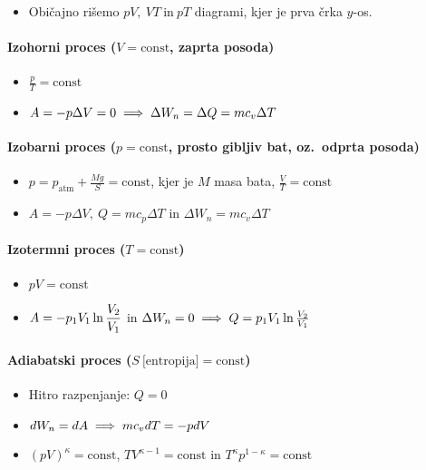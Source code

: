 \begin{itemize}
    \item Običajno rišemo \(pV, \ VT \ \text{in} \ pT\) diagrami, kjer je prva črka \(y\)-os.
\end{itemize}

\paragraph{Izohorni proces (\(V = \text{const}\), zaprta posoda)}
\begin{itemize}
    \item \(\frac{p}{T} = \text{const}\)
    \item \(A = -p \Delta V = 0 \implies \Delta W_n =  \Delta Q = mc_v  \Delta T\)
\end{itemize}

\paragraph{Izobarni proces (\(p = \text{const}\), prosto gibljiv bat, oz.\ odprta posoda)}
\begin{itemize}
    \item \(p = p_\text{atm} + \frac{Mg}{S} = \text{const}\), kjer je \(M\) masa bata, \(\frac{V}{T} = \text{const}\)
    \item \(A = -p\Delta V, \ Q = mc_p \Delta T\) in \(\Delta W_n = mc_v \Delta T\)
\end{itemize}

\paragraph{Izotermni proces (\(T = \text{const}\))}
\begin{itemize}
    \item \(pV = \text{const}\)
    \item \(\displaystyle A = -p_1V_1 \ln \frac{V_2}{V_1}\) in \(\Delta W_n = 0 \implies Q = p_1V_1 \ln \frac{V_2}{V_1}\)
\end{itemize}

\paragraph{Adiabatski proces (\(S \  \text{[entropija]} = \text{const}\))}
\begin{itemize}
    \item Hitro razpenjanje: \(Q = 0\)
    \item \(dW_n = dA \implies mc_vdT = -pdV\)
    \item \((pV)^\kappa = \text{const}\), \(TV^{\kappa-1} = \text{const}\) in \(T^\kappa p^{1 - \kappa} = \text{const}\)
\end{itemize}

